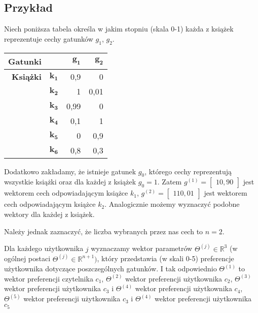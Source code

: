 \documentclass[12pt,a4paper]{report}
\begin{document}
\subsection*{Przykład}
Niech poniższa tabela określa w jakim stopniu (skala 0-1) każda z książek reprezentuje cechy gatunków $g_1$, $g_2$.
\begin{center}
\begin{tabular}{|r|r|r|r|} \hline
\textbf{Gatunki} & & $\mathbf{g_1}$ & $\mathbf{g_2}$  \\
\hline
\hline
\textbf{Książki} &$\mathbf{k_1}$ & 0,9 & 0 \\
\hline
&$\mathbf{k_2}$ & 1 & 0,01  \\
\hline
&$\mathbf{k_3}$ & 0,99 & 0 \\
\hline
&$\mathbf{k_4}$ & 0,1 & 1 \\
\hline
&$\mathbf{k_5}$ & 0 & 0,9 \\
\hline
&$\mathbf{k_6}$ & 0,8 & 0,3 \\
\hline
\end{tabular}
\end{center}
Dodatkowo zakładamy, że istnieje gatunek $g_0$, którego cechy reprezentują wszystkie książki oraz dla każdej z książek $g_0=1$.
Zatem $g^{(1)}= \left[
        \begin{array}{c}
         1 
         0,9
         0
         \end{array}
      \right] $ jest wektorem cech odpowiadającym książce $k_1$, $g^{(2)}= \left[
        \begin{array}{c}
         1 
         1
         0,01
         \end{array}
      \right] $ jest wektorem cech odpowiadającym książce $k_2$. Analogicznie możemy wyznaczyć podobne wektory dla każdej z książek.

Należy jednak zaznaczyć, że liczba wybranych przez nas cech to $n=2$.

Dla każdego użytkownika $j$ wyznaczamy wektor parametrów $\Theta^{(j)} \in \mathbb{R}^3$ (w ogólnej postaci $\Theta^{(j)} \in \mathbb{R}^{n+1})$, który przedstawia (w skali 0-5) preferencje użytkownika dotyczące poszczególnych gatunków. I tak odpowiednio $\Theta^{(1)}$ to wektor preferencji czytelnika $c_1$, $\Theta^{(2)}$ wektor preferencji użytkownika $c_2$, $\Theta^{(3)}$ wektor preferencji użytkownika $c_3$ i $\Theta^{(4)}$ wektor preferencji użytkownika $c_4$, $\Theta^{(5)}$ wektor preferencji użytkownika $c_3$ i $\Theta^{(4)}$ wektor preferencji użytkownika $c_5$
\end{document}

